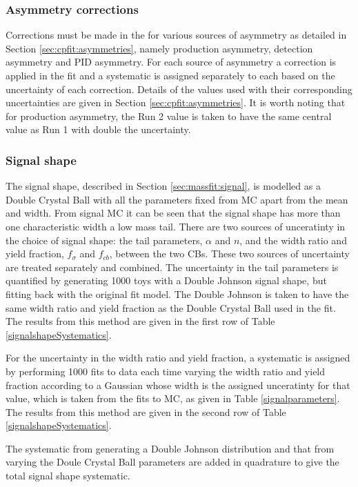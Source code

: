 \subsubsection{Asymmetry corrections}

Corrections must be made in the \CP for various sources of asymmetry as detailed in Section \ref{sec:cpfit:asymmetries}, namely production asymmetry, detection asymmetry and PID asymmetry. For each source of asymmetry a correction is applied in the \CP fit and a systematic is assigned separately to each based on the uncertainty of each correction. Details of the values used with their corresponding uncertainties are given in Section \ref{sec:cpfit:asymmetries}. It is worth noting that for production asymmetry, the Run 2 value is taken to have the same central value as Run 1 with double the uncertainty. 

\subsubsection{Signal shape}
\label{sec:systematics:signal}

The signal shape, described in Section \ref{sec:massfit:signal}, is modelled as a Double Crystal Ball with all the parameters fixed from MC apart from the mean and width. From signal MC it can be seen that the signal shape has more than one characteristic width a low mass tail. There are two sources of unceratinty in the choice of signal shape: the tail parameters, $\alpha$ and $n$, and the width ratio and yield fraction, $f_{\sigma}$ and $f_{cb}$, between the two CBs. These two sources of uncertainty are treated separately and combined. The uncertainty in the tail parameters is quantified by generating 1000 toys with a Double Johnson signal shape, but fitting back with the original fit model. The Double Johnson is taken to have the same width ratio and yield fraction as the Double Crystal Ball used in the \CP fit. The results from this method are given in the first row of Table \ref{signalshapeSystematics}.

For the uncertainty in the width ratio and yield fraction, a systematic is assigned by performing 1000 fits to data each time varying the width ratio and yield fraction according to a Gaussian whose width is the assigned unceratinty for that value, which is taken from the fits to MC, as given in Table \ref{signalparameters}. The results from this method are given in the second row of Table \ref{signalshapeSystematics}.

The systematic from generating a Double Johnson distribution and that from varying the Doule Crystal Ball parameters are added in quadrature to give the total signal shape systematic.

